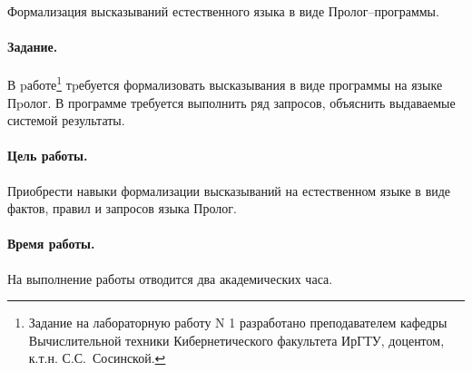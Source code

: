\documentclass[12pt, openany, oneside]{book} %
\begin{document}
Формализация высказываний естественного языка в виде Про\-лог--прог\-рам\-мы.

\paragraph{Задание.} В pаботе\footnote{Задание на лабораторную работу N 1 разработано преподавателем кафедры Вычислительной техники Кибернетического факультета ИрГТУ, доцентом, к.т.н. С.С.~Сосинской.} тpебуется формализовать высказывания в виде программы на языке Пpолог. В программе требуется выполнить ряд запросов, объяснить выдаваемые системой результаты.

\paragraph{Цель работы.} Приобрести навыки формализации высказываний на естественном языке в виде фактов, правил и запросов языка Пролог.

\paragraph{Время работы.} На выполнение работы отводится два академических часа.
\end{document}
